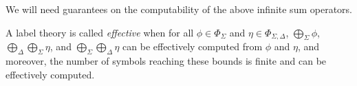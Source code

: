 



\noindent 
We will need guarantees on the computability
of the above infinite sum operators.
%
\begin{definition}\label{def:effective}
A label theory is called \emph{effective} when
for all $\phi \in \Phi_\Sigma$ and $\eta \in \Phi_{\Sigma, \Delta}$,
$\bigoplus_{\Sigma} \phi$,
$\bigoplus_{\Delta}\bigoplus_{\Sigma} \eta$, and
$\bigoplus_{\Sigma}\bigoplus_{\Delta} \eta$
can be effectively computed from $\phi$ and $\eta$,
and moreover, the number of symbols reaching these bounds is finite
and can be effectively computed.
\end{definition}






%



